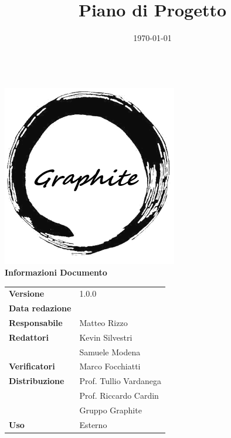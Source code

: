 \documentclass[openany,12pt,a4paper]{report}
\title{Piano di Progetto}
\author{}
\date{\today}
\begin{document}
	\makeatletter
	\begin{titlepage}
		\setlength{\headsep}{0pt}  
		\begin{center}
			{\huge \bfseries  \@title }\\[10ex]
			\includegraphics[width=0.5\linewidth]{logo.png}\\[1em]
			\textbf{\Large Informazioni Documento} \\[2em]
			\bgroup
			\def\arraystretch{1.5}
			\begin{tabular}{l|l}
				\textbf{Versione} & 1.0.0 \\
				\textbf{Data redazione} & \large \@date \\
				\textbf{Responsabile} & Matteo Rizzo \\
				\textbf{Redattori} & Kevin Silvestri \\ 
								   & Samuele Modena \\
				\textbf{Verificatori} & Marco Focchiatti \\
				\textbf{Distribuzione} & Prof. Tullio Vardanega \\
				 & Prof. Riccardo Cardin \\
				 & Gruppo Graphite \\
				\textbf{Uso} & Esterno \\
			\end{tabular}
		\egroup
		\end{center}
	\end{titlepage}
	\makeatother

	\thispagestyle{empty}
	\newpage
	
	\tableofcontents
	\listoffigures
	\listoftables
	
	
	
	
	
	
\end{document}
